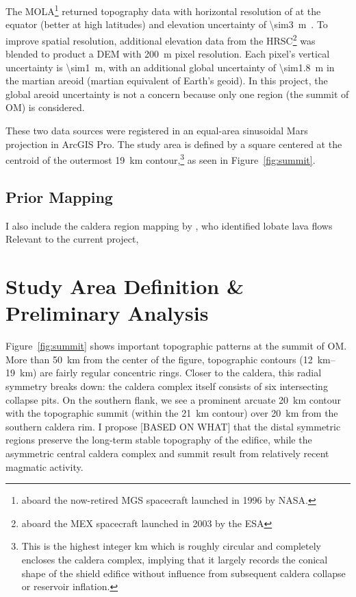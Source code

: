 The \acf{MOLA}\footnote{aboard the now-retired \ac{MGS} spacecraft launched in 1996 by \acs{NASA}.} returned topography data with horizontal resolution of  at the equator (better at high latitudes) and elevation uncertainty of \qty{\sim3}{\m}~\parencite{smith_mars_2001}. To improve spatial resolution, additional elevation data from the \ac{HRSC}\footnote{aboard the \ac{MEX} spacecraft launched in 2003 by the \ac{ESA}} was blended to product a \ac{DEM} with \qty{200}{\m} pixel resolution. Each pixel's vertical uncertainty is \qty{\sim1}{\m}, with an additional global uncertainty of \qty{\sim1.8}{\m} in the martian areoid (martian equivalent of Earth's geoid). In this project, the global areoid uncertainty is not a concern because only one region (the summit of \ac{OM}) is considered.

These two data sources were registered in an equal-area sinusoidal Mars projection in ArcGIS Pro. The study area is defined by a square  centered at the centroid of the outermost \qty{19}{\km} contour,\footnote{This is the highest integer \unit{km} which is roughly circular and completely encloses the caldera complex, implying that it largely records the conical shape of the shield edifice without influence from subsequent caldera collapse or reservoir inflation.} as seen in Figure~\ref{fig:summit}.

\subsection{Prior Mapping}
I also include the caldera region mapping by \textcite{mouginis-mark_geologic_2021}, who identified lobate lava flows Relevant to the current project, 

\section{Study Area Definition \& Preliminary Analysis}

Figure~\ref{fig:summit} shows important topographic patterns at the summit of \ac{OM}. More than \qty{50}{\km} from the center of the figure, topographic contours (\qtyrange{12}{19}{\km}) are fairly regular concentric rings. Closer to the caldera, this radial symmetry breaks down: the caldera complex itself consists of six intersecting collapse pits. On the southern flank, we see a prominent arcuate \qty{20}{\km} contour with the topographic summit (within the \qty{21}{\km} contour) over \qty{20}{\km} from the southern caldera rim. I propose [BASED ON WHAT] that the distal symmetric regions preserve the long-term stable topography of the edifice, while the asymmetric central caldera complex and summit result from relatively recent magmatic activity. 

